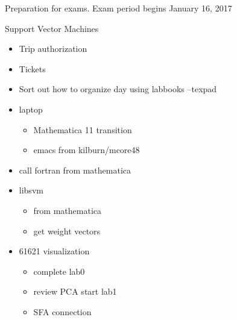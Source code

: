 \documentclass[hyperref]{labbook}
\begin{document}




Preparation for exams.  Exam period begins January 16, 2017


\begin{description}
\item[Support Vector Machines] 
\end{description}



\begin{itemize}
\item Trip authorization
\item Tickets
\end{itemize}


\begin{itemize}
\item Sort out how to organize day using labbooks --texpad
\item laptop 
  \begin{itemize}
  \item Mathematica 11 transition
  \item emacs from kilburn/mcore48
  \end{itemize}
\item call fortran from mathematica
\item libsvm
  \begin{itemize}
  \item from mathematica
  \item get weight vectors
  \end{itemize}
\item 61621 visualization
  \begin{itemize}
  \item complete lab0
  \item review PCA start lab1
  \item SFA connection
  \end{itemize}



  
\end{itemize}



\end{document}
